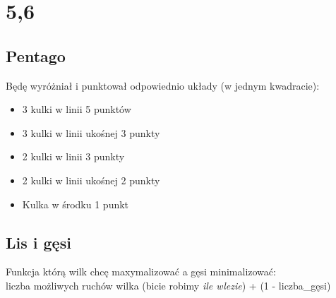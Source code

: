 \documentclass{article}
\begin{document}
\section{5,6}
\subsection*{Pentago}
Będę wyróżniał i punktował odpowiednio układy (w jednym kwadracie):\\
\begin{itemize}
\item 3 kulki w linii \hspace*{\fill} 5 punktów
\item 3 kulki w linii ukośnej \hspace*{\fill} 3 punkty
\item 2 kulki w linii \hspace*{\fill} 3 punkty
\item 2 kulki w linii ukośnej\hspace*{\fill} 2 punkty
\item Kulka w środku \hspace*{\fill} 1 punkt
\end{itemize}
\subsection*{Lis i gęsi}
Funkcja którą wilk chcę maxymalizować a gęsi minimalizować:\\
liczba możliwych ruchów wilka (bicie robimy \textit{ile wlezie}) + (1 - liczba\_gęsi)\\\\\\\\\\\\\\\\\\\\\\\\
\end{document}
